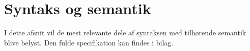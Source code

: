\section{Syntaks og semantik}\label{sec:Syntax}
I dette afsnit vil de mest relevante dele af syntaksen med tilhørende semantik blive belyst. Den fulde specifikation kan findes i bilag. 





